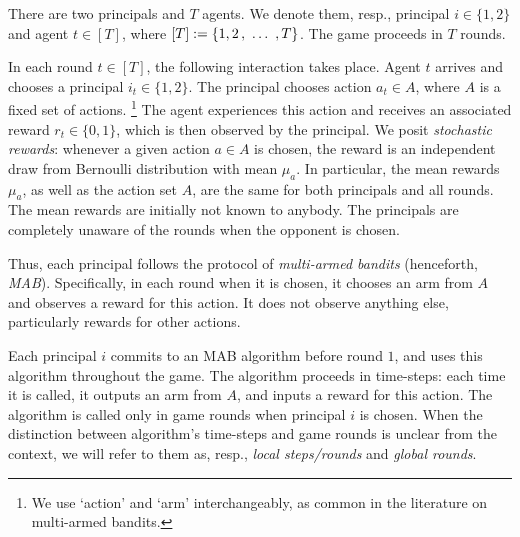  There are two principals and $T$ agents. We denote them, resp., principal $i\in \{1,2\}$ and agent $t\in [T]$,
where $[T] := \{1,2\, ,\ \ldots\ , T\}$.
The game proceeds in $T$ rounds.

In each round $t\in [T]$, the following  interaction takes place. Agent $t$ arrives and chooses a principal $i_t\in \{1,2\}$. The principal chooses action $a_t\in A$, where $A$ is a fixed set of actions.%
\footnote{We use `action' and `arm' interchangeably, as common in the literature on multi-armed bandits.}
The agent experiences this action and receives an associated reward $r_t\in \{ 0,1\}$, which is then observed by the principal. We posit \emph{stochastic rewards}: whenever a given action $a\in A$ is chosen, the reward is an independent draw from Bernoulli distribution with mean $\mu_a$. In particular, the mean rewards $\mu_a$, as well as the action set $A$, are the same for both principals and all rounds. The mean rewards are initially not known to anybody. The principals are completely unaware of the rounds when the opponent is chosen.




Thus, each principal follows the protocol of \emph{multi-armed bandits} (henceforth, \emph{MAB}). Specifically, in each round when it is chosen, it chooses an arm from $A$ and observes a reward for this action. It does not observe anything else, particularly rewards for other actions.

Each principal $i$ commits to an MAB algorithm \alg[i] before round $1$, and uses this algorithm throughout the game. The algorithm proceeds in time-steps:
each time it is called, it outputs an arm from $A$, and inputs a reward for this action. The algorithm is called only in game rounds when principal $i$ is chosen.
When the distinction between algorithm's time-steps and game rounds is unclear from the context, we will refer to them as, resp., \emph{local steps/rounds} and \emph{global rounds}.

\newcommand{\est}{\mathtt{EST}}



